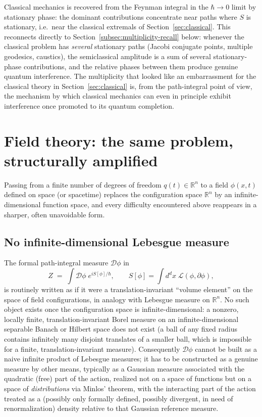 \documentclass[11pt]{article}
\newcommand{\R}{\mathbb{R}}
\newcommand{\D}{\mathcal{D}}
\begin{document}
Classical mechanics is recovered from the Feynman integral in the $\hbar\to0$ limit by stationary phase: the dominant contributions concentrate near paths where $S$ is stationary, i.e.\ near the classical extremals of Section~\ref{sec:classical}. This reconnects directly to Section~\ref{subsec:multiplicity-recall} below: whenever the classical problem has \emph{several} stationary paths (Jacobi conjugate points, multiple geodesics, caustics), the semiclassical amplitude is a sum of several stationary-phase contributions, and the relative phases between them produce genuine quantum interference. The multiplicity that looked like an embarrassment for the classical theory in Section~\ref{sec:classical} is, from the path-integral point of view, the mechanism by which classical mechanics can even in principle exhibit interference once promoted to its quantum completion.

\label{subsec:multiplicity-recall}

\section{Field theory: the same problem, structurally amplified}
\label{sec:field}

Passing from a finite number of degrees of freedom $q(t)\in\R^n$ to a field $\phi(x,t)$ defined on space (or spacetime) replaces the configuration space $\R^n$ by an infinite-dimensional function space, and every difficulty encountered above reappears in a sharper, often unavoidable form.

\subsection{No infinite-dimensional Lebesgue measure}

The formal path-integral measure $\D\phi$ in
\[
Z \;=\; \int \D\phi\; e^{iS[\phi]/\hbar}, \qquad S[\phi]=\int d^dx\; \mathcal L(\phi,\partial\phi),
\]
is routinely written as if it were a translation-invariant ``volume element'' on the space of field configurations, in analogy with Lebesgue measure on $\R^n$. No such object exists once the configuration space is infinite-dimensional: a nonzero, locally finite, translation-invariant Borel measure on an infinite-dimensional separable Banach or Hilbert space does not exist (a ball of any fixed radius contains infinitely many disjoint translates of a smaller ball, which is impossible for a finite, translation-invariant measure). Consequently $\D\phi$ cannot be built as a naive infinite product of Lebesgue measures; it has to be constructed as a genuine measure by other means, typically as a Gaussian measure associated with the quadratic (free) part of the action, realized not on a space of functions but on a space of \emph{distributions} via Minlos' theorem, with the interacting part of the action treated as a (possibly only formally defined, possibly divergent, in need of renormalization) density relative to that Gaussian reference measure.
\end{document}
